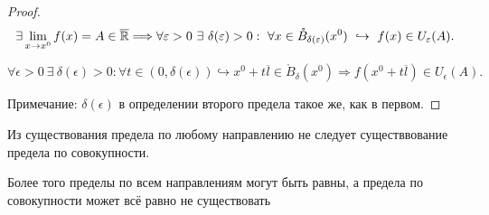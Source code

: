 \begin{proof}
    $$\exists \lim_{x \to x^0} f(x) = A \in \overline{\mathbb{R}} \Longrightarrow    \forall \varepsilon > 0 \  \exists \  \delta(\varepsilon) > 0: \ \forall x \in \mathring{B}_{\delta(\varepsilon)}(x^0) \  \hookrightarrow \ f(x) \in U_{\varepsilon}(A).
    $$

    $$\forall \epsilon > 0 \  \exists \  \delta(\epsilon) > 0: \forall t \in (0, \delta(\epsilon)) \hookrightarrow x^0 + t \overline{l} \in \mathring{B}_{\delta}(x^0) \Longrightarrow f(x^0 + t \overline{l}) \in U_{\epsilon}(A).$$

    Примечание: $\delta(\epsilon)$ в определении второго предела такое же, как в первом.
\end{proof}


\begin{note}
    Из существования предела по любому направлению не следует существвование предела по совокупности.

    Более того пределы по всем направлениям могут быть равны, а предела по совокупности может всё равно не существовать

\end{note}

